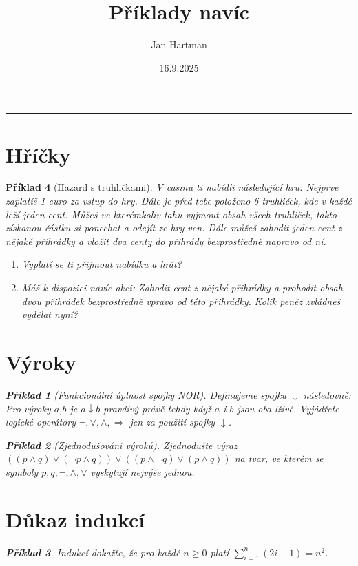 \documentclass[10pt]{article}
\title{Příklady navíc}
\author{Jan Hartman}
\date{16.9.2025}
\newcommand{\titlerule}{%
    \noindent %
    \makebox[\textwidth]{\large \thetitle \hfill \thedate}
    \rule{\textwidth}{0.4pt}%
}
\theoremstyle{definitionstyle}
\theoremstyle{problemstyle}
\newtheorem{problem}{Příklad}
\begin{document}
\titlerule

\section{Hříčky}

\begin{problem}[Hazard s truhličkami]
V casinu ti nabídli následující hru: Nejprve zaplatíš 1 euro za vstup do hry. Dále je před tebe položeno 6 truhliček, kde v každé leží jeden cent. Můžeš ve kterémkoliv tahu vyjmout obsah všech truhliček, takto získanou částku si ponechat a odejít ze hry ven. Dále můžeš zahodit jeden cent z nějaké přihrádky a vložit dva centy do přihrády bezprostředně napravo od ní.

\begin{enumerate}[label=(\alph*)]
\item Vyplatí se ti přijmout nabídku a hrát?
\item Máš k dispozici navíc akci: Zahodit cent z nějaké přihrádky a prohodit obsah dvou přihrádek bezprostředně vpravo od této přihrádky. Kolik peněz zvládneš vydělat nyní?
\end{enumerate}

\section{Výroky}

\begin{problem}[Funkcionální úplnost spojky NOR]
Definujeme spojku $\downarrow$ následovně: Pro výroky $a$,$b$ je $a \downarrow b$ pravdivý právě tehdy když $a$ i $b$ jsou oba lživé. Vyjádřete logické operátory $\neg, \vee, \wedge, \Rightarrow$ jen za použití spojky $\downarrow$. 
\end{problem}

\begin{problem}[Zjednodušování výroků]
Zjednodušte výraz $((p \wedge q) \vee (\neg p \wedge q) ) \vee ( (p \wedge \neg q) \vee (p \wedge q)  )$ na tvar, ve kterém se symboly $p,q,\neg,\wedge,\vee$ vyskytují nejvýše jednou.
\end{problem}

\section{Důkaz indukcí}

\begin{problem}
Indukcí dokažte, že pro každé $n \geq 0$ platí $\sum_{i=1}^{n}(2i-1) = n^2$.
\end{problem}

\end{problem}
\end{document}
